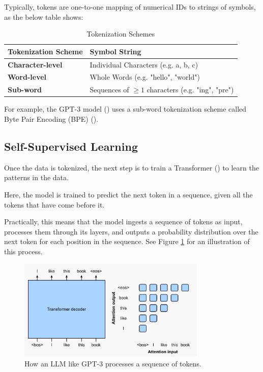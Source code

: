 \documentclass{article} %
\begin{document}
Typically, tokens are one-to-one mapping of numerical IDs to strings of symbols, as the below table shows:
\begin{table}[h]
\centering
\begin{tabular}{p{}p{}}
\toprule
\textbf{Tokenization Scheme} & \textbf{Symbol String} \\
\midrule
\textbf{Character-level} & Individual Characters (e.g. a, b, c) \\
\addlinespace
\textbf{Word-level} & Whole Words (e.g. "hello", "world") \\
\addlinespace
\textbf{Sub-word} & Sequences of $\geq 1$ characters (e.g. "ing", "pre") \\
\bottomrule
\end{tabular}
\caption{Tokenization Schemes}
\label{tab:tok_schemes}
\end{table}

For example, the GPT-3 model (\cite{Brown-et-al-2020}) uses a sub-word tokenization scheme 
called Byte Pair Encoding (BPE) (\cite{Sennrich-et-al-2016}).

\subsection{Self-Supervised Learning}
Once the data is tokenized, the next step is to train a Transformer (\cite{Vaswani-et-al-2017}) to learn the patterns in the data.

Here, the model is trained to predict the next token in a sequence,
given all the tokens that have come before it.

Practically, this means that the model ingests a sequence of tokens as input, 
processes them through its layers, and outputs a probability distribution over the next token
for each position in the sequence. See Figure \ref{fig:gpt-decoder-only} for an illustration of this process.

\begin{figure}[h]
    \centering
    \includegraphics[width=0.8\textwidth]{images/gpt-decoder-only.png}
    \caption{How an LLM like GPT-3 processes a sequence of tokens.}
    \label{fig:gpt-decoder-only}
\end{figure}
\end{document}
